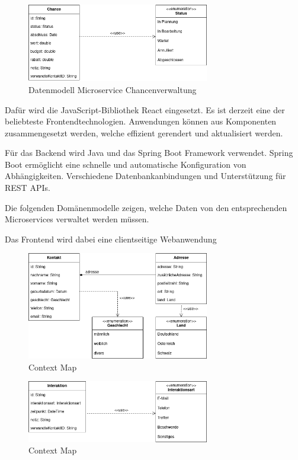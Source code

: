 \begin{figure}[H] 
    \centering
    \includegraphics[width=0.71\textwidth]{figures/DatenmodellChance.png}
    \caption{Datenmodell Microservice Chancenverwaltung}
    \label{fig:CRMENTWURF}
\end{figure} 

Dafür wird die JavaScript-Bibliothek React eingesetzt. Es ist derzeit eine der beliebteste Frontendtechnologien. Anwendungen können aus Komponenten zusammengesetzt werden, welche effizient gerendert und aktualisiert werden.

Für das Backend wird Java und das Spring Boot Framework verwendet. Spring Boot ermöglicht eine schnelle und automatische Konfiguration von Abhängigkeiten. Verschiedene Datenbankanbindungen und Unterstützung für REST APIs.


 Die folgenden Domänenmodelle zeigen, welche Daten von den entsprechenden Microservices verwaltet werden müssen.

Das Frontend wird dabei eine clientseitige Webanwendung

\begin{figure}[H] 
    \centering
    \includegraphics[width=0.71\textwidth]{figures/KontaktUMLDiagram.png}
    \caption{Context Map}
    \label{fig:CRMENTWURF}
\end{figure} 

\begin{figure}[H] 
    \centering
    \includegraphics[width=0.71\textwidth]{figures/InteraktionUMLDiagram.png}
    \caption{Context Map}
    \label{fig:CRMENTWURF}
\end{figure} 

